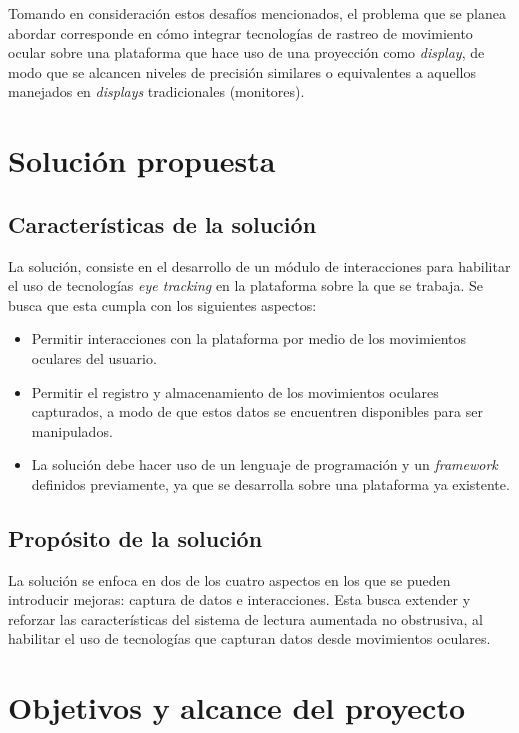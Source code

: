 Tomando en consideración estos desafíos mencionados, el problema que se planea abordar corresponde en cómo integrar tecnologías de rastreo de movimiento ocular sobre una plataforma que hace uso de una proyección como \textit{display}, de modo que se alcancen niveles de precisión similares o equivalentes a aquellos manejados en \textit{displays} tradicionales (monitores).

\section{Soluci\'on propuesta}
\label{intro:solucion}
\subsection{Características de la solución}
La solución, consiste en el desarrollo de un módulo de interacciones para habilitar el uso de tecnologías \textit{eye tracking} en la plataforma sobre la que se trabaja. Se busca que esta cumpla con los siguientes aspectos:
\begin{itemize}
    \item Permitir interacciones con la plataforma por medio de los movimientos oculares del usuario. %
    \item Permitir el registro y almacenamiento de los movimientos oculares capturados, a modo de que estos datos se encuentren disponibles para ser manipulados.
    \item La solución debe hacer uso de un lenguaje de programación y un \textit{framework} definidos previamente, ya que se desarrolla sobre una plataforma ya existente.
\end{itemize}

\subsection{Propósito de la solución}
La solución se enfoca en dos de los cuatro aspectos en los que se pueden introducir mejoras: captura de datos e interacciones. Esta busca extender y reforzar las características del sistema de lectura aumentada no obstrusiva, al habilitar el uso de tecnologías que capturan datos desde movimientos oculares.

\section{Objetivos y alcance del proyecto}
\label{intro:objetivos}


